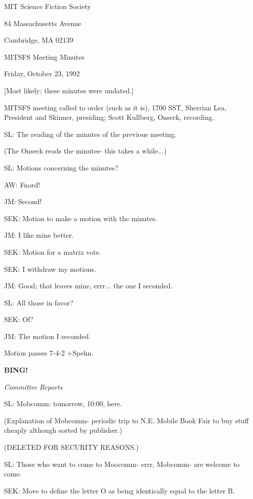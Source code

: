 \documentclass[12pt]{article}
\newcommand{\bing}{{\bf BING!} }
\newcommand{\goto}[1]{\bing \vskip 12pt \centerline{{\em{#1}}}}
\begin{document}
\begin{center}

MIT Science Fiction Society 

84 Massachusetts Avenue

Cambridge, MA 02139

\vspace{12pt}

MITSFS Meeting Minutes 

Friday, October 23, 1992

[Most likely; these minutes were undated.]

\end{center}
 
\vspace{18pt}

\setlength{\parskip}{6pt}

\noindent
MITSFS meeting called to order (such as it is), 1700 SST, Sherrian Lea, President and Skinner, presiding; Scott Kullberg, Onseck, recording.

SL: The reading of the minutes of the previous meeting.

(The Onseck reads the minutes- this takes a while...)

SL: Motions concerning the minutes?

AW: Fnord!

JM: Second!

SEK: Motion to make a motion with the minutes.

JM: I like mine better.

SEK: Motion for a matrix vote.

SEK: I withdraw my motions.

JM: Good; that leaves mine, errr... the one I seconded.

SL: All those in favor?

SEK: Of?

JM: The motion I seconded.

Motion passes 7-4-2 +Spehn.

\goto{Committee Reports}

SL: Mobcomm: tomorrow, 10:00, here.

(Explanation of Mobcomm- periodic trip to N.E. Mobile Book Fair to buy stuff cheaply although sorted by publisher.)

(DELETED FOR SECURITY REASONS.)

SL: Those who want to come to Moocomm- errr, Mobcomm- are welcome to come.

SEK: Move to define the letter O as being identically equal to the letter B.
\end{document}
